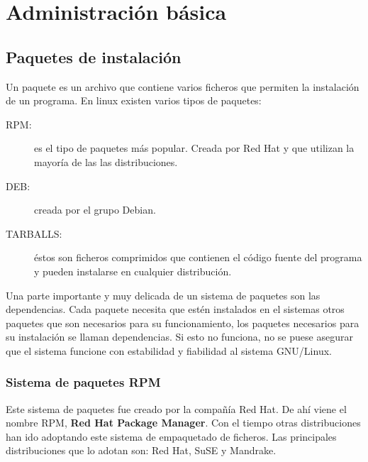 

\chapter{Administración básica}
\label{administracion.tex}
\section{Paquetes de instalación}

Un paquete es un archivo que  contiene varios ficheros que permiten la
instalación de un programa. En linux existen varios tipos de paquetes:

\begin{description}

\item[RPM:]    es  el   tipo  de
paquetes más popular. Creada por Red  Hat y que utilizan la mayoría de
las las distribuciones.

\item[DEB:]  creada por  el grupo
Debian.

\item[TARBALLS:]    éstos son
ficheros comprimidos  que contienen  el código  fuente del  programa y
pueden instalarse en cualquier distribución.

\end{description}

Una parte importante y muy delicada  de un sistema de paquetes son las
dependencias.  Cada  paquete  necesita  que  estén  instalados  en  el
sistemas otros paquetes que son necesarios para su funcionamiento, los
paquetes  necesarios para  su instalación  se llaman  dependencias. Si
esto no  funciona, no se  puese asegurar  que el sistema  funcione con
estabilidad y fiabilidad al sistema GNU/Linux.



\subsection{Sistema de paquetes RPM}
Este sistema  de paquetes fue creado  por la compañía  Red  Hat. De ahí
viene el  nombre RPM,  {\bf Red  Hat Package  Manager}. Con  el tiempo
otras distribuciones han ido adoptando  este sistema de empaquetado de
ficheros. Las principales  distribuciones que lo adotan  son: Red Hat,
SuSE  y Mandrake. 

